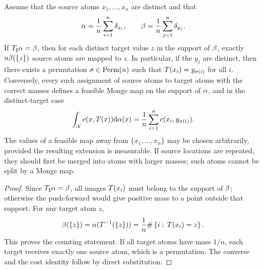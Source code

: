 \begin{prop}\label{prop-empirical-monge-matching}
	Assume that the source atoms $x_1,\ldots,x_n$ are distinct and that
	\[
		\alpha=\frac1n\sum_{i=1}^n\delta_{x_i},
		\qquad
		\beta=\frac1n\sum_{j=1}^n\delta_{y_j}.
	\]
	If $T_\sharp\alpha=\beta$, then for each distinct target value $z$ in the support of $\beta$, exactly $n\beta(\{z\})$ source atoms are mapped to $z$. In particular, if the $y_j$ are distinct, then there exists a permutation $\sigma\in\mathrm{Perm}(n)$ such that $T(x_i)=y_{\sigma(i)}$ for all $i$. Conversely, every such assignment of source atoms to target atoms with the correct masses defines a feasible Monge map on the support of $\alpha$, and in the distinct-target case
	\[
		\int_{\mathcal{X}} c(x,T(x))\mathrm{d}\alpha(x)=\frac1n\sum_{i=1}^n c(x_i,y_{\sigma(i)}).
	\]
	The values of a feasible map away from $\{x_1,\ldots,x_n\}$ may be chosen arbitrarily, provided the resulting extension is measurable. If source locations are repeated, they should first be merged into atoms with larger masses; such atoms cannot be split by a Monge map.
\end{prop}
\begin{proof}
	Since $T_\sharp\alpha=\beta$, all images $T(x_i)$ must belong to the support of $\beta$; otherwise the push-forward would give positive mass to a point outside that support. For any target atom $z$,
	\[
		\beta(\{z\})=\alpha(T^{-1}(\{z\}))=\frac1n\#\left\{ i \;;\; T(x_i)=z \right\}.
	\]
	This proves the counting statement. If all target atoms have mass $1/n$, each target receives exactly one source atom, which is a permutation. The converse and the cost identity follow by direct substitution.
\end{proof}

